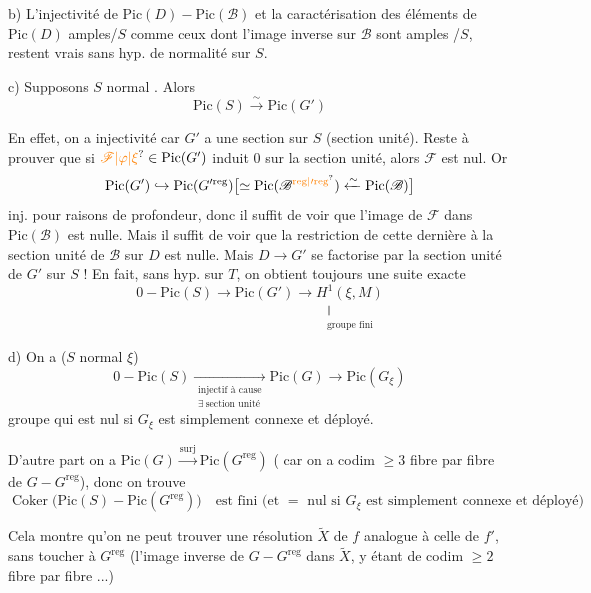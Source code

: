 b) L'injectivité de $\mathrm{Pic}(D)-\mathrm{Pic}(\mathscr B)$ et la caractérisation des éléments de $\mathrm{Pic}(D)$ amples/$S$ comme ceux dont l'image inverse sur $\mathscr B$ sont amples /$S$, restent vrais sans hyp. de normalité sur $S$.

c) Supposons $S$ normal . Alors
\[
\mathrm{Pic}(S)\xrightarrow{\sim}\mathrm{Pic}(G')
\]

En effet, on  a injectivité car $G'$ a une section sur $S$ (section unité). Reste à prouver que si $\unsure{\mathscr F|\varphi|\xi}\in\mathrm{Pic}(G')$ induit 0 sur la section unité, alors $\mathscr F$ est nul. Or
\[
\mathrm{Pic}(G')\hookrightarrow\mathrm{Pic}(G'^{\mathrm{reg}})\bigl[\simeq\mathrm{Pic}(\mathscr B^{\unsure{\mathrm{reg}|\prime\mathrm{reg}}})\xleftarrow{\sim}\mathrm{Pic}(\mathscr B)\bigr]
\]
inj. pour raisons de profondeur, donc il suffit  de voir que l'image  de $\mathscr F$ dans $\mathrm{Pic}(\mathscr B)$ est nulle. Mais il suffit de voir que la restriction de cette dernière à la section unité de $\mathscr B$ sur $D$ est nulle. Mais $D\longrightarrow G'$
se factorise par la section unité de $G'$ sur $S$ ! En fait, sans hyp. sur $T$, on obtient toujours une suite exacte
\[
0-\mathrm{Pic}(S)\longrightarrow\mathrm{Pic}(G')\longrightarrow
\underset{\substack{\Vert\\\text{groupe fini}}}{H^1(\xi,M)}
\]

d) On a  ($S$ normal  $\xi$)
\[
0-\mathrm{Pic}(S)\underset{\substack{\text{injectif à cause}\\\exists\ \text{section unité}}}{\longrightarrow}\mathrm{Pic}(G)\longrightarrow\mathrm{Pic}(G_\xi)
\]
groupe  qui est nul si $G_\xi$ est simplement connexe et déployé.

 D'autre part  on a $\mathrm{Pic}(G)\xrightarrow{\mathrm{surj}}\mathrm{Pic}(G^{\mathrm{reg}})$ ( car on a codim $\geq3$ fibre par fibre  de $G-G^{\mathrm{reg}}$), donc on trouve
\[
\operatorname{Coker}\bigl(\mathrm{Pic}(S)-\mathrm{Pic}(G^{\mathrm{reg}})\bigr)
\quad\text{est fini (et $=$ nul si $G_\xi$ est simplement connexe et déployé)}
\]

Cela montre  qu'on ne peut trouver une résolution $\widetilde X$ de $f$ analogue à celle de $f'$, sans toucher à $G^{\mathrm{reg}}$ (l'image inverse de $G-G^{\mathrm{reg}}$ dans $\widetilde X$, y étant de codim $\geq2$ fibre par fibre ...)

